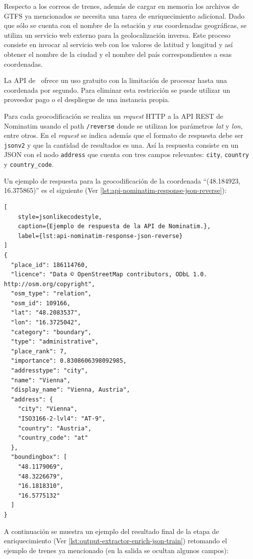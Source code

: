 Respecto a los correos de trenes, además de cargar en memoria los archivos de GTFS ya mencionados se necesita una tarea
de enriquecimiento adicional.
Dado que sólo se cuenta con el nombre de la estación y sus coordenadas geográficas, se utiliza un servicio web externo
para la geolocalización inversa.
Este proceso consiste en invocar al servicio web con los valores de latitud y longitud y así obtener el nombre de la
ciudad y el nombre del país correspondientes a esas coordenadas.

La API de~\cite{nominatim-api-overview} ofrece un uso gratuito con
la limitación de procesar hasta una coordenada por segundo.
Para eliminar esta restricción se puede utilizar un proveedor pago o el despliegue de una instancia propia.

Para cada geocodificación se realiza un \textit{request} HTTP a la API REST de Nominatim usando el path
\texttt{/reverse} donde se utilizan los parámetros \textit{lat} y \textit{lon}, entre otros.
En el \textit{request} se indica además que el formato de respuesta debe ser \texttt{jsonv2} y que la cantidad de
resultados es una.
Así la respuesta consiste en un JSON con el nodo \texttt{address} que cuenta con tres campos relevantes: \texttt{city},
\texttt{country} y \texttt{country\_code}.

Un ejemplo de respuesta para la geocodificación de la coordenada ``(48.184923, 16.375865)'' es el
siguiente (Ver \autoref{lst:api-nominatim-response-json-reverse}):

\begin{lstlisting}[
    style=jsonlikecodestyle,
    caption={Ejemplo de respuesta de la API de Nominatim.},
    label={lst:api-nominatim-response-json-reverse}
]
{
  "place_id": 186114760,
  "licence": "Data © OpenStreetMap contributors, ODbL 1.0. http://osm.org/copyright",
  "osm_type": "relation",
  "osm_id": 109166,
  "lat": "48.2083537",
  "lon": "16.3725042",
  "category": "boundary",
  "type": "administrative",
  "place_rank": 7,
  "importance": 0.8308606398092985,
  "addresstype": "city",
  "name": "Vienna",
  "display_name": "Vienna, Austria",
  "address": {
    "city": "Vienna",
    "ISO3166-2-lvl4": "AT-9",
    "country": "Austria",
    "country_code": "at"
  },
  "boundingbox": [
    "48.1179069",
    "48.3226679",
    "16.1818310",
    "16.5775132"
  ]
}
\end{lstlisting}

A continuación se muestra un ejemplo del resultado final de la etapa de enriquecimiento (Ver
\autoref{lst:output-extractor-enrich-json-train}) retomando el ejemplo de trenes ya mencionado (en la salida se ocultan
algunos campos):

